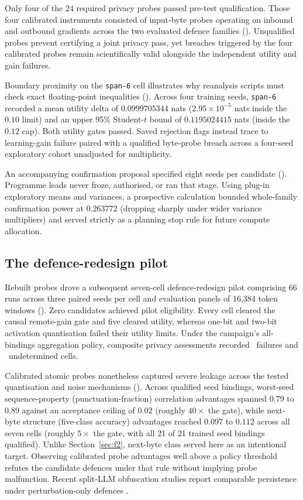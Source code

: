 Only four of the 24 required privacy probes passed pre-test qualification.
Those four calibrated instruments consisted of input-byte probes operating
on inbound and outbound gradients across the two evaluated defence families
(). Unqualified probes prevent certifying a joint privacy
pass, yet breaches triggered by the four calibrated probes remain
scientifically valid alongside the independent utility and gain failures.

Boundary proximity on the \texttt{span-6} cell illustrates why reanalysis
scripts must check exact floating-point inequalities ().
Across four training seeds, \texttt{span-6} recorded a mean utility delta
of $0.0999705344$ nats ($2.95\times 10^{-5}$ nats inside the $0.10$ limit)
and an upper 95\% Student-$t$ bound of $0.1195024415$ nats (inside the
$0.12$ cap). Both utility gates passed. Saved rejection flags instead trace
to learning-gain failure paired with a qualified byte-probe breach across a
four-seed exploratory cohort unadjusted for multiplicity.

An accompanying confirmation proposal specified eight seeds per candidate
(). Programme leads never froze, authorised, or ran that
stage. Using plug-in exploratory means and variances, a prospective
calculation bounded whole-family confirmation power at $0.263772$ (dropping
sharply under wider variance multipliers) and served strictly as a planning
stop rule for future compute allocation.

\subsection{The defence-redesign pilot}
\label{sec:f4}

Rebuilt probes drove a subsequent seven-cell defence-redesign pilot
comprising 66 runs across three paired seeds per cell and evaluation panels
of 16,384 token windows (). Zero candidates achieved pilot
eligibility. Every cell cleared the causal remote-gain gate and five
cleared utility, whereas one-bit and two-bit activation quantisation failed
their utility limits. Under the campaign's all-bindings aggregation policy,
composite privacy assessments recorded \PfourPrivacyFailures\ failures and
\PfourPrivacyUndetermined\ undetermined cells.

Calibrated atomic probes nonetheless captured severe leakage across the
tested quantisation and noise mechanisms (). Across qualified
seed bindings, worst-seed sequence-property (punctuation-fraction)
correlation advantages spanned $0.79$ to $0.89$ against an acceptance
ceiling of $0.02$ (roughly $40\times$ the gate), while next-byte structure
(five-class accuracy) advantages reached $0.097$ to $0.112$ across all
seven cells (roughly $5\times$ the gate, with all 21 of 21 trained seed
bindings qualified). Unlike Section~\ref{sec:f2}, next-byte class served
here as an intentional target. Observing calibrated probe advantages well
above a policy threshold refutes the candidate defences under that rule
without implying probe malfunction. Recent split-LLM obfuscation studies
report comparable persistence under perturbation-only defences
\cite{privpair2026,mixguard2026}.

